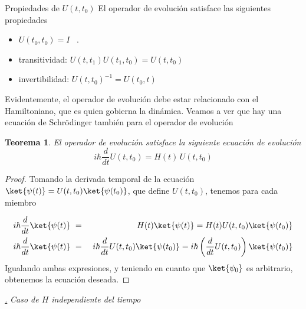 \documentclass[a4paper,11pt]{book} %
\newtheorem{teorema_contador}{Teorema}
\newcommand{\Teorema}[1]{
		\begin{mybox_gray2}{}
			\begin{teorema_contador}
				 #1 
			\end{teorema_contador} 
		\end{mybox_gray2}
	}
\numberwithin{equation}{chapter}
\def\subsubiContadorIt{\par\addtocounter{subsubsection}{1}\underline{\it\thesubsubsection.}\hskip0.5cm \setcounter{subsubsubsectionIt}{0}}
\newcommand{\SubsubiIt}[1]{
		\subsubiContadorIt \textit{#1}
	}
\newcounter{subsubsubsectionIt}[subsubsection]
\begin{document}
\begin{mybox_blue}{Propiedades de ${U(t,t_0)}$}
El operador de evolución satisface las siguientes propiedades
\begin{itemize}
	\item $U(t_0,t_0) = I$ \, .
	\item transitividad:  $U(t,t_1)U(t_1,t_0)= U(t,t_0)$
	\item invertibilidad: $U(t,t_0)^{-1} = U(t_0,t)$
\end{itemize}
\end{mybox_blue}

Evidentemente, el operador de evolución debe estar relacionado con el Hamiltoniano, que es quien gobierna la dinámica. Veamos a ver que hay una ecuación de Schrödinger también para el operador de evolución

	\Teorema{
	El operador de evolución satisface la siguiente ecuación de evolución
		\begin{equation}
		i \hbar \frac{d}{dt}U(t,t_0) = H(t)\, U(t,t_0)
		\end{equation}
	}
\begin{proof}
Tomando la derivada temporal de la ecuación $\ket{\psi(t)} = U(t,t_0)\ket{\psi(t_0)}$, que define $U(t,t_0)$, tenemos para cada miembro

\begin{eqnarray}
i \hbar \frac{d}{dt}\ket{\psi(t)} &~=~&   H(t)\ket{\psi(t)} =  H(t)U(t,t_0)\ket{\psi(t_0)}  \nonumber\\
i \hbar \frac{d}{dt}\ket{\psi(t)} &~=~& i \hbar \frac{d}{dt}U(t,t_0)\ket{\psi(t_0)} = i \hbar \left(\frac{d}{dt}U(t,t_0)\right)\ket{\psi(t_0)}
\end{eqnarray}
Igualando ambas expresiones, y teniendo en cuanto que $\ket{\psi_0}$ es arbitrario, obtenemos la ecuación deseada.
\end{proof}



		\SubsubiIt{Caso de $H$ independiente del tiempo}
\end{document}
